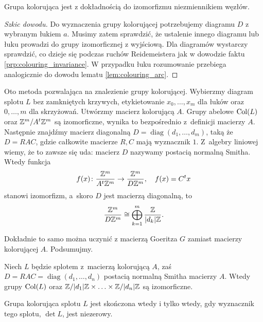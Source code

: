\begin{proposition}
    Grupa kolorująca jest z dokładnością do izomorfizmu niezmiennikiem węzłów.
\end{proposition}

\begin{proof}[Szkic dowodu]
    Do wyznaczenia grupy kolorującej potrzebujemy diagramu $D$ z wybranym łukiem $a$.
    Musimy zatem sprawdzić, że ustalenie innego diagramu lub łuku prowadzi do grupy izomorficznej z wyjściową.
    Dla diagramów wystarczy sprawdzić, co dzieje się podczas ruchów Reidemeistera jak w dowodzie faktu \ref{prp:colouring_invariance}.
    W przypadku łuku rozumowanie przebiega analogicznie do dowodu lematu \ref{lem:colouring_arc}.
\end{proof}

Oto metoda pozwalająca na znalezienie grupy kolorującej.
Wybierzmy diagram splotu $L$ bez zamkniętych krzywych, etykietowanie $x_0, \ldots, x_m$ dla łuków oraz $0, \ldots, m$ dla skrzyżowań.
Utwórzmy macierz kolorującą $A$.
Grupy abelowe $\operatorname{Col}(L)$ oraz $\mathbb Z^m / A^t \mathbb Z^m$ są izomorficzne, wynika to bezpośrednio z~definicji macierzy $A$.
Następnie znajdźmy macierz diagonalną $D = \operatorname{diag}(d_1, \ldots, d_m)$, taką że $D = RAC$, gdzie całkowite macierze $R, C$ mają wyznacznik $1$.
Z~algebry liniowej wiemy, że to zawsze się uda: macierz $D$ nazywamy postacią normalną Smitha.
Wtedy funkcja
\begin{equation}
    f(x) \colon \frac{\mathbb Z^m}{A^t \mathbb Z^m} \to \frac{\mathbb Z^m}{D\mathbb Z^m}, \quad f(x) = C^t x
\end{equation}
stanowi izomorfizm, a~skoro $D$ jest macierzą diagonalną, to
\begin{equation}
    \frac{\mathbb Z^m}{D\mathbb Z^m} \cong \bigoplus_{k=1}^m \frac{\mathbb Z}{|d_k| \mathbb Z}.
\end{equation}

Dokładnie to samo można uczynić z macierzą Goeritza $G$ zamiast macierzy kolorującej $A$.
Podsumujmy.

\begin{proposition}
\label{prp:colouring_group_summands}%
    Niech $L$ będzie splotem z~macierzą kolorującą $A$, zaś $D = RAC = \operatorname{diag}(d_1, \ldots, d_n)$ postacią normalną Smitha macierzy $A$.
    Wtedy grupy $\operatorname{Col}(L)$ oraz $\mathbb Z/|d_1| \mathbb Z \times \ldots \times \mathbb Z/|d_n| \mathbb Z$ są izomorficzne.
\end{proposition}

\begin{corollary}
    Grupa kolorująca splotu $L$ jest skończona wtedy i tylko wtedy, gdy wyznacznik tego splotu, $\det L$, jest niezerowy.
\end{corollary}

